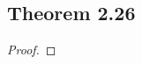 \documentclass[../../main.tex]{subfiles}
\begin{document}
\subsection{Theorem 2.26}
\begin{wts}

\end{wts}
\begin{proof}

\end{proof}
\end{document}
